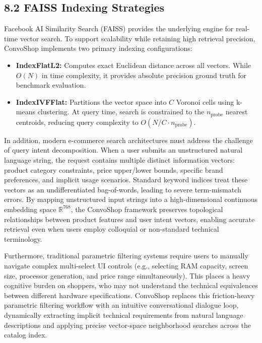 \documentclass[12pt,a4paper]{article}
\begin{document}
\subsection*{8.2 FAISS Indexing Strategies}
\label{sec:8.2}
Facebook AI Similarity Search (FAISS) provides the underlying engine for real-time vector search. To support scalability while retaining high retrieval precision, ConvoShop implements two primary indexing configurations:
\begin{itemize}
    \item \textbf{IndexFlatL2:} Computes exact Euclidean distance across all vectors. While $O(N)$ in time complexity, it provides absolute precision ground truth for benchmark evaluation.
    \item \textbf{IndexIVFFlat:} Partitions the vector space into $C$ Voronoi cells using k-means clustering. At query time, search is constrained to the $n_{\text{probe}}$ nearest centroids, reducing query complexity to $O(N/C \cdot n_{\text{probe}})$.
\end{itemize}



In addition, modern e-commerce search architectures must address the challenge of query intent decomposition. When a user submits an unstructured natural language string, the request contains multiple distinct information vectors: product category constraints, price upper/lower bounds, specific brand preferences, and implicit usage scenarios. Standard keyword indices treat these vectors as an undifferentiated bag-of-words, leading to severe term-mismatch errors. By mapping unstructured input strings into a high-dimensional continuous embedding space $\mathbb{R}^{768}$, the ConvoShop framework preserves topological relationships between product features and user intent vectors, enabling accurate retrieval even when users employ colloquial or non-standard technical terminology.

Furthermore, traditional parametric filtering systems require users to manually navigate complex multi-select UI controls (e.g., selecting RAM capacity, screen size, processor generation, and price range simultaneously). This places a heavy cognitive burden on shoppers, who may not understand the technical equivalences between different hardware specifications. ConvoShop replaces this friction-heavy parametric filtering workflow with an intuitive conversational dialogue loop, dynamically extracting implicit technical requirements from natural language descriptions and applying precise vector-space neighborhood searches across the catalog index.
\end{document}
